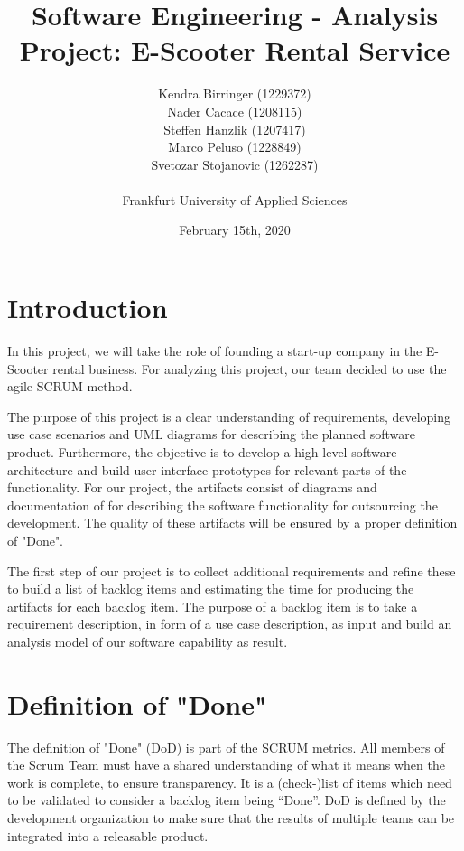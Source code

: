 \documentclass[a4paper, 12pt]{article}
\title{Software Engineering - Analysis\\
Project: E-Scooter Rental Service}
\author{
    Kendra Birringer (1229372)\\
    Nader Cacace (1208115)\\
    Steffen Hanzlik (1207417)\\
    Marco Peluso (1228849)\\
    Svetozar Stojanovic (1262287)\\
    \\
    Frankfurt University of Applied Sciences
}
\date{February 15th, 2020}
\begin{document}
\maketitle
\newpage
\tableofcontents

\newpage
\section{Introduction}
In this project, we will take the role of founding a start-up company in the E-Scooter rental business.
For analyzing this project, our team decided to use the agile SCRUM method.

The purpose of this project is a clear understanding of requirements, developing use case scenarios and UML diagrams for describing the planned software product.
Furthermore, the objective is to develop a high-level software architecture and build user interface prototypes for relevant parts of the functionality.
For our project, the artifacts consist of diagrams and documentation of for describing the software functionality for outsourcing the development. The quality of these artifacts will be ensured by a proper definition of "Done".

The first step of our project is to collect additional requirements and refine these to build a list of backlog items and estimating the time for producing the artifacts for each backlog item. The purpose of a backlog item is to take a requirement description, in form of a use case description, as input and build an analysis model of our software capability as result.

\section{Definition of "Done"}
The definition of "Done" (DoD) is part of the SCRUM metrics. All members of the Scrum Team must have a shared understanding of what it means when the work is complete, to ensure transparency. \cite{scrumguide}
It is a (check-)list of items which need to be validated to consider a backlog item being “Done”. DoD is defined by the development organization to make sure that the results of multiple teams can be integrated into a releasable product. \cite{thoma1}
\end{document}
